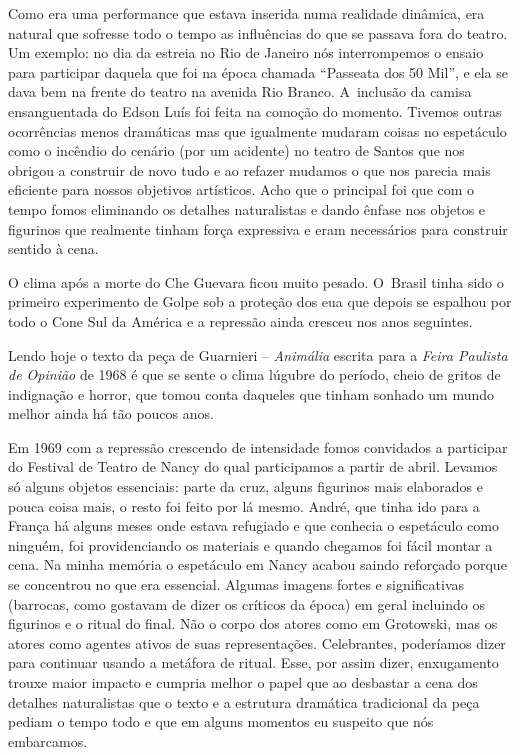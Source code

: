 Como era uma performance que estava inserida numa realidade dinâmica,
era natural que sofresse todo o tempo as influências do que se passava
fora do teatro. Um exemplo: no dia da estreia no Rio de Janeiro nós
interrompemos o ensaio para participar daquela que foi na época chamada
“Passeata dos 50 Mil”, e ela se dava bem na frente do teatro na avenida
Rio Branco. A~inclusão da camisa ensanguentada do Edson Luís foi feita
na comoção do momento. Tivemos outras ocorrências menos dramáticas mas
que igualmente mudaram coisas no espetáculo como o incêndio do cenário
(por um acidente) no teatro de Santos que nos obrigou a construir de
novo tudo e ao refazer mudamos o que nos parecia mais eficiente para
nossos objetivos artísticos. Acho que o principal foi que com o tempo
fomos eliminando os detalhes naturalistas e dando ênfase nos objetos e
figurinos que realmente tinham força expressiva e eram necessários para
construir sentido à cena.

O clima após a morte do Che Guevara ficou muito pesado. O~Brasil tinha
sido o primeiro experimento de Golpe sob a proteção dos {\sc eua} que depois
se espalhou por todo o Cone Sul da América e a repressão ainda cresceu
nos anos seguintes.

Lendo hoje o texto da peça de Guarnieri -- {\it Animália} escrita para a
{\it Feira Paulista de Opinião} de 1968 é que se sente o clima lúgubre
do período, cheio de gritos de indignação e horror, que tomou conta
daqueles que tinham sonhado um mundo melhor ainda há tão poucos anos.

Em 1969 com a repressão crescendo de intensidade fomos convidados a
participar do Festival de Teatro de Nancy do qual participamos a partir
de abril. Levamos só alguns objetos essenciais: parte da cruz, alguns
figurinos mais elaborados e pouca coisa mais, o resto foi feito por lá
mesmo. André, que tinha ido para a França há alguns meses onde estava
refugiado e que conhecia o espetáculo como ninguém, foi providenciando
os materiais e quando chegamos foi fácil montar a cena. Na minha memória
o espetáculo em Nancy acabou saindo reforçado porque se concentrou no
que era essencial. Algumas imagens fortes e significativas (barrocas,
como gostavam de dizer os críticos da época) em geral incluindo os
figurinos e o ritual do final. Não o corpo dos atores como em Grotowski,
mas os atores como agentes ativos de suas representações. Celebrantes,
poderíamos dizer para continuar usando a metáfora de ritual. Esse, por
assim dizer, enxugamento trouxe maior impacto e cumpria melhor o papel
que ao desbastar a cena dos detalhes naturalistas que o texto e a
estrutura dramática tradicional da peça pediam o tempo todo e que em
alguns momentos eu suspeito que nós embarcamos.

